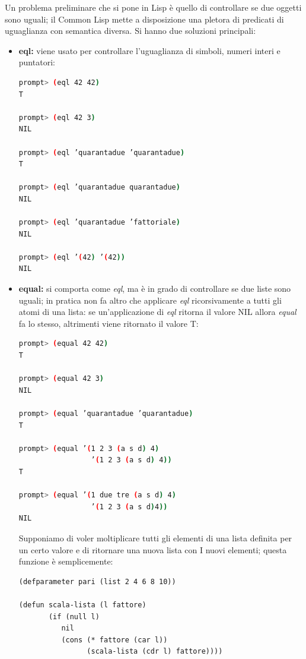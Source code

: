 \documentclass[a4paper,12pt, oneside]{book}
\begin{document}
Un problema preliminare che si pone in Lisp è quello di
controllare se due oggetti sono uguali; il Common Lisp mette a disposizione una pletora di predicati di uguaglianza con
semantica diversa. Si hanno due soluzioni principali:
\begin{itemize}
\item \textbf{eql:} viene usato per controllare l’uguaglianza di simboli, numeri interi e puntatori:
\begin{shaded}
\begin{lstlisting}[language=bash]
prompt> (eql 42 42)
T

prompt> (eql 42 3)
NIL

prompt> (eql ’quarantadue ’quarantadue)
T

prompt> (eql ’quarantadue quarantadue)
NIL

prompt> (eql ’quarantadue ’fattoriale)
NIL

prompt> (eql ’(42) ’(42))
NIL
\end{lstlisting}
\end{shaded}
\item \textbf{equal:} si comporta come \textit{eql}, ma è in grado di controllare se due liste sono uguali; in pratica non fa altro che applicare \textit{eql} ricorsivamente a tutti
gli atomi di una lista: se un'applicazione di \textit{eql} ritorna il valore NIL allora \textit{equal} fa lo stesso, altrimenti viene ritornato il valore T:
\begin{shaded}
\begin{lstlisting}[language=bash]
prompt> (equal 42 42)
T

prompt> (equal 42 3)
NIL

prompt> (equal ’quarantadue ’quarantadue)
T

prompt> (equal ’(1 2 3 (a s d) 4) 
                 ’(1 2 3 (a s d) 4))
T

prompt> (equal ’(1 due tre (a s d) 4) 
                 ’(1 2 3 (a s d)4))
NIL
\end{lstlisting}
\end{shaded}
Supponiamo di voler moltiplicare tutti gli elementi di una lista definita per un certo valore e di ritornare una nuova lista con I nuovi elementi; questa
funzione è semplicemente:
\begin{verbatim}
(defparameter pari (list 2 4 6 8 10))

(defun scala-lista (l fattore)
       (if (null l)
          nil
          (cons (* fattore (car l))
                (scala-lista (cdr l) fattore))))
\end{verbatim}
\end{itemize}
\end{document}
